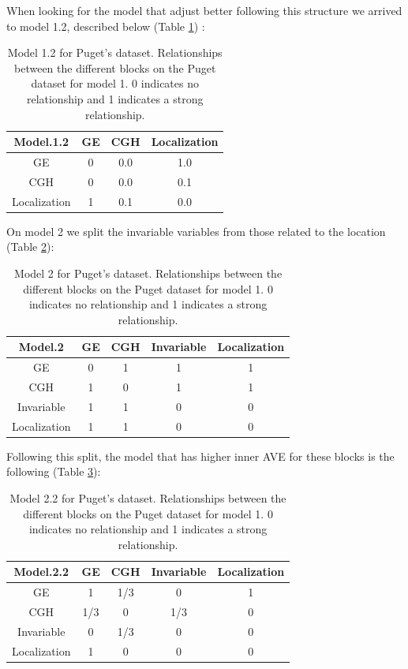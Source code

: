 \documentclass[
  a4paper,
]{book}
\begin{document}
When looking for the model that adjust better following this structure we arrived to model 1.2, described below (Table \ref{tab:puget-model1-2}) :

\begin{table}

\caption[Model 1.2 for Puget's dataset.]{\label{tab:puget-model1-2}Model 1.2 for Puget's dataset. Relationships between the different blocks on the Puget dataset for model 1. 0 indicates no relationship and 1 indicates a strong relationship.}
\centering
\begin{tabular}[t]{c|c|c|c}
\hline
Model.1.2 & GE & CGH & Localization\\
\hline
GE & 0 & 0.0 & 1.0\\
\hline
CGH & 0 & 0.0 & 0.1\\
\hline
Localization & 1 & 0.1 & 0.0\\
\hline
\end{tabular}
\end{table}

On model 2 we split the invariable variables from those related to the location (Table \ref{tab:puget-model2}):

\begin{table}

\caption[Model 2 for Puget's dataset.]{\label{tab:puget-model2}Model 2 for Puget's dataset. Relationships between the different blocks on the Puget dataset for model 1. 0 indicates no relationship and 1 indicates a strong relationship.}
\centering
\begin{tabular}[t]{c|c|c|c|c}
\hline
Model.2 & GE & CGH & Invariable & Localization\\
\hline
GE & 0 & 1 & 1 & 1\\
\hline
CGH & 1 & 0 & 1 & 1\\
\hline
Invariable & 1 & 1 & 0 & 0\\
\hline
Localization & 1 & 1 & 0 & 0\\
\hline
\end{tabular}
\end{table}

Following this split, the model that has higher inner AVE for these blocks is the following (Table \ref{tab:puget-model2-2}):

\begin{table}

\caption[Model 2.2 for Puget's dataset.]{\label{tab:puget-model2-2}Model 2.2 for Puget's dataset. Relationships between the different blocks on the Puget dataset for model 1. 0 indicates no relationship and 1 indicates a strong relationship.}
\centering
\begin{tabular}[t]{c|c|c|c|c}
\hline
Model.2.2 & GE & CGH & Invariable & Localization\\
\hline
GE & 1 & 1/3 & 0 & 1\\
\hline
CGH & 1/3 & 0 & 1/3 & 0\\
\hline
Invariable & 0 & 1/3 & 0 & 0\\
\hline
Localization & 1 & 0 & 0 & 0\\
\hline
\end{tabular}
\end{table}
\end{document}
